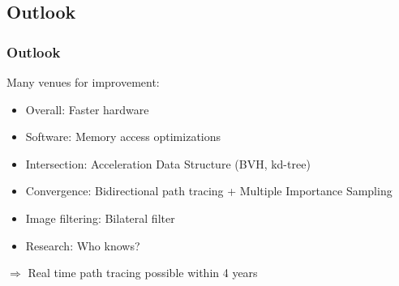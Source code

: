 \documentclass{beamer}
\begin{document}
    \subsection{Outlook}
    \begin{frame}
        \frametitle{Outlook}
        Many venues for improvement:
        \pause
        \begin{itemize}
            \item Overall: Faster hardware
                \pause
            \item Software: Memory access optimizations
                \pause
            \item Intersection: Acceleration Data Structure (BVH, kd-tree)
                \pause
            \item Convergence: Bidirectional path tracing + Multiple Importance Sampling
                \pause
            \item Image filtering: Bilateral filter
                \pause
            \item Research: Who knows?
        \end{itemize}
        \pause
        \(\Longrightarrow\) Real time path tracing possible within 4 years
    \end{frame}
    
\end{document}

